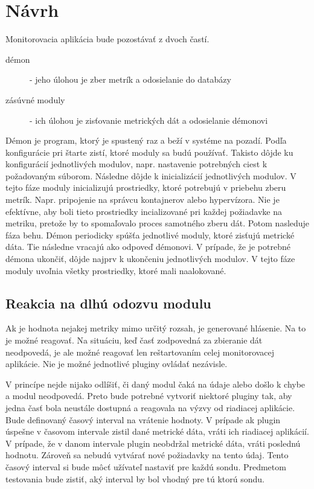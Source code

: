 \documentclass[11pt,final,oneside]{fithesis}
\begin{document}
\chapter{Návrh}
Monitorovacia aplikácia bude pozostávať z dvoch častí.
\begin{description}
\item[démon] - jeho úlohou je zber metrík a odosielanie do databázy
\item[zásúvné moduly] - ich úlohou je zisťovanie metrických dát a odosielanie démonovi
\end{description}

Démon je program, ktorý je spustený raz a beží v systéme na pozadí. Podľa konfigurácie pri štarte zistí, ktoré moduly sa budú používať. Takisto dôjde ku konfigurácií jednotlivých modulov, napr. nastavenie
potrebných ciest k požadovaným súborom. Následne dôjde k inicializácií jednotlivých modulov. V tejto fáze moduly inicializujú prostriedky, ktoré potrebujú v priebehu zberu metrík. Napr. pripojenie na správcu kontajnerov alebo hypervízora. Nie je efektívne, aby boli tieto prostriedky incializované pri
každej požiadavke na metriku, pretože by to spomaľovalo proces samotného zberu dát. Potom nasleduje fáza behu. Démon periodicky spúšťa jednotlivé moduly, ktoré zisťujú metrické dáta. Tie následne
vracajú ako odpoveď démonovi. V prípade, že je potrebné démona ukončiť, dôjde najprv k ukončeniu jednotlivých modulov. V tejto fáze moduly uvoľnia všetky prostriedky, ktoré mali naalokované.


\section{Reakcia na dlhú odozvu modulu}
Ak je hodnota nejakej metriky mimo určitý rozsah, je generované hlásenie. Na to je možné reagovať.
Na situáciu, keď časť zodpovedná za zbieranie dát neodpovedá, je ale možné reagovať len reštartovaním celej monitorovacej aplikácie. Nie je možné jednotlivé pluginy ovládať nezávisle. 

V princípe nejde nijako odlíšiť, či daný modul čaká na údaje alebo došlo k chybe a modul neodpovedá. Preto bude potrebné vytvoriť niektoré pluginy tak, aby jedna časť bola neustále dostupná 
a reagovala na výzvy od riadiacej aplikácie. Bude definovaný časový interval na vrátenie hodnoty. V prípade ak plugin úspešne v časovom intervale zistil dané metrické dáta, vráti ich riadiacej aplikácií. V prípade, že v danom intervale plugin neobdržal metrické dáta,
vráti poslednú hodnotu. Zároveň sa nebudú vytvárať nové požiadavky na tento údaj. Tento časový interval si bude môcť užívateľ nastaviť pre každú sondu. Predmetom testovania bude zistiť, 
aký interval by bol vhodný pre tú ktorú sondu.
\end{document}
